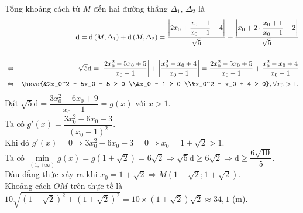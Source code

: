 \begin{bt}
{		Tổng khoảng cách từ $M$ đến hai đường thẳng $\Delta_1$,  $\Delta_2$ là
		 \allowdisplaybreaks
		\begin{eqnarray*}
			&&\mathrm{d}= \mathrm{d}\left(M, \Delta_1\right) + \mathrm{d}\left(M, \Delta_2\right) = \dfrac{\left|2 x_0 + \dfrac{x_0 + 1}{x_0-1} - 4\right|}{\sqrt{5}} +  \dfrac{\left|x_0 + 2 \cdot \dfrac{x_0+1}{x_0-1} - 2\right|}{\sqrt{5}}\\\\
			&\Leftrightarrow & \sqrt{5}  \mathrm{d} = \left|\dfrac{2x_0^2 - 5x_0 + 5}{x_0 - 1}\right| + \left|\dfrac{x_0^2 - x_0 + 4}{x_0 - 1}\right| = \dfrac{2x_0^2 - 5x_0 + 5}{x_0 - 1} + \dfrac{x_0^2 - x_0 + 4}{x_0 - 1}\\
			&\Leftrightarrow & \heva{&2x_0^2 - 5x_0 + 5 > 0 \\&x_0 - 1 > 0 \\&x_0^2 - x_0  + 4 > 0}, \forall x_0 > 1.
		\end{eqnarray*}
		Đặt $\sqrt{5}\mathrm{d} = \dfrac{3x_0^2 - 6x_0  + 9}{x_0 - 1} = g(x)$ với $x > 1$.\\
		Ta có $g'(x) = \dfrac{3x_0^2 - 6x_0 - 3}{\left(x_0 -  1\right)^2}$.\\
		Khi đó $g'(x)  = 0 \Rightarrow 3x_0^2 - 6x_0 - 3 = 0 \Rightarrow x_0 = 1 + \sqrt{2}>1$.\\
		Ta có $\min\limits _{(1; +\infty)} g(x) = g \left(1 + \sqrt{2}\right) =  6\sqrt{2} \Rightarrow \sqrt{5}\mathrm{d} \geq 6 \sqrt{2} \Rightarrow \mathrm{d} \geq \dfrac{6\sqrt{10}}{5}$.\\
		Dấu đẳng thức xảy ra khi $x_0 = 1 + \sqrt{2} \Rightarrow M \left(1 +  \sqrt{2}; 1 + \sqrt{2}\right)$.\\
		Khoảng cách $OM$ trên thực tế là  $10\sqrt{\left(1+\sqrt{2}\right)^2+\left(1+\sqrt{2}\right)^2} = 10 \times\left(1+\sqrt{2}\right) \sqrt{2} \approx 34{,}1$ (m).
	} 
\end{bt}

